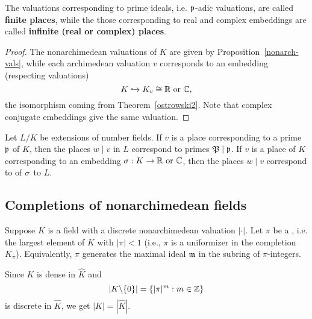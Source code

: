 The valuations corresponding to prime ideals, i.e. $\mathfrak{p}$-adic valuations, are called \textbf{finite places}, while the those corresponding to real and complex embeddings are called \textbf{infinite (real or complex) places}.
\begin{proof}
The nonarchimedean valuations of $K$ are given by Proposition~\ref{nonarch-vals}, while each archimedean valuation $v$ corresponds to an embedding (respecting valuations)
\[
K\hookrightarrow K_v\cong \mathbb{R}\text{ or }\mathbb{C},
\]
the isomorphism coming from Theorem~\ref{ostrowski2}. Note that complex conjugate embeddings give the same valuation.
\end{proof}
\begin{cor}
Let $L/K$ be extensions of number fields. If $v$ is a place corresponding to a prime $\mathfrak{p}$ of $K$, then the places $w\mid v$ in $L$ correspond to primes $\mathfrak{P}\mid \mathfrak{p}$. If $v$ is a place of $K$ corresponding to an embedding $\sigma:K\to \mathbb{R}\text{ or }\mathbb{C}$, then the places $w\mid v$ correspond to of $\sigma$ to $L$.
\end{cor}
\subsection{Completions of nonarchimedean fields}
Suppose $K$ is a field with a discrete nonarchimedean valuation $|\cdot|$. Let $\pi$ be a , i.e. the largest element of $K$ with $|\pi|<1$ (i.e., $\pi$ is a uniformizer in the completion $K_{\pi}$). Equivalently, $\pi$ generates the maximal ideal $\mathfrak{m}$ in the subring of $\pi$-integers.

Since $K$ is dense in $\hat K$ and 
\[|K\backslash\{0\}|=\left\{{|\pi|^m}:{m\in \mathbb{Z}}\right\}\]
is discrete in $\hat K$, we get $|K|=|\hat K|$.

